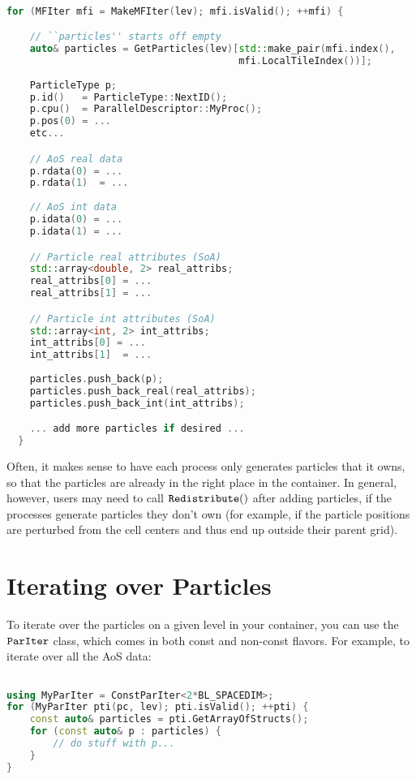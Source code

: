 \begin{lstlisting}[language=cpp]

for (MFIter mfi = MakeMFIter(lev); mfi.isValid(); ++mfi) {

    // ``particles'' starts off empty
    auto& particles = GetParticles(lev)[std::make_pair(mfi.index(),
                                        mfi.LocalTileIndex())];
 
    ParticleType p;
    p.id()   = ParticleType::NextID();
    p.cpu()  = ParallelDescriptor::MyProc();
    p.pos(0) = ...
    etc...

    // AoS real data
    p.rdata(0) = ...
    p.rdata(1)  = ...
         
    // AoS int data
    p.idata(0) = ...
    p.idata(1) = ...

    // Particle real attributes (SoA)
    std::array<double, 2> real_attribs;
    real_attribs[0] = ...
    real_attribs[1] = ...

    // Particle int attributes (SoA)
    std::array<int, 2> int_attribs;
    int_attribs[0] = ...
    int_attribs[1]  = ...
 
    particles.push_back(p);
    particles.push_back_real(real_attribs);
    particles.push_back_int(int_attribs);

    ... add more particles if desired ...
  }

\end{lstlisting}

Often, it makes sense to have each process only generates particles that it owns, so that the particles are already in the right place in the container. 
In general, however, users may need to call $\tt{Redistribute()}$ after adding particles, if the processes generate particles they don't own (for example,
if the particle positions are perturbed from the cell centers and thus end up outside their parent grid).

\section{Iterating over Particles}
\label{sec:Particles:Iterating}

To iterate over the particles on a given level in your container, you can use the $\tt{ParIter}$ class, which comes in 
both const and non-const flavors. For example, to iterate over all the AoS data:

\begin{lstlisting}[language=cpp]

using MyParIter = ConstParIter<2*BL_SPACEDIM>;
for (MyParIter pti(pc, lev); pti.isValid(); ++pti) {
    const auto& particles = pti.GetArrayOfStructs();
    for (const auto& p : particles) {
        // do stuff with p...
    }
}
\end{lstlisting}

